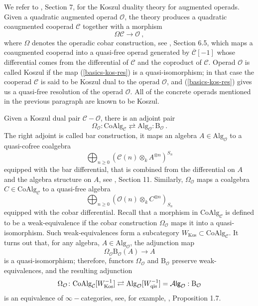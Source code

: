 \documentclass[10pt, oneside]{amsart}
\theoremstyle{plain}
\newcommand{\alg}{\mathrm{Alg}}
\newcommand{\Alg}{\mathcal{A}\text{\sf lg}}
\newcommand{\C}{\mathcal{C}}
\newcommand{\coalg}{\mathrm{CoAlg}}
\renewcommand{\O}{\mathcal{O}}
\begin{document}
We refer to \cite{LV}, Section 7, for the Koszul duality theory for augmented operads. Given a quadratic augmented operad $\O$, the
theory produces a quadratic coaugmented cooperad $\C$ together with a morphism
\begin{equation}\label{basics-kos-res}
\Omega \C \longrightarrow \O \:,
\end{equation}
where $\Omega$ denotes the operadic cobar construction, see \cite{LV}, Section 6.5, which maps a coaugmented cooperad into
a quasi-free operad generated by $\overline{\C}[-1]$ whose differential comes from the differential of $\C$ and the
coproduct of $\C$. Operad $\O$ is called Koszul if the map (\ref{basics-kos-res}) is a quasi-isomorphism; in that case
the cooperad $\C$ is said to be Koszul dual to the operad $\O$, and 
(\ref{basics-kos-res}) gives us a quasi-free resolution of the operad $\O$. All of the concrete operads mentioned in the previous 
paragraph are known to be Koszul.

Given a Koszul dual pair $\C - \O$, there is an adjoint pair
\begin{equation*}
\Omega_{\O} \colon \coalg_\C \rightleftarrows \alg_\O : \text{B}_{\O} \:.
\end{equation*}
The right adjoint is called bar construction, it maps an algebra $A \in \alg_\O$ to a quasi-cofree coalgebra
\begin{equation*}
\bigoplus_{n\ge 0} (\C(n) \otimes_k A^{\otimes n})^{S_n}
\end{equation*}
equipped with the bar differential, that is combined from the differential on $A$ and the algebra structure on $A$, see \cite{LV},
Section 11. Similarly, $\Omega_\O$ maps a coalgebra $C \in \coalg_\C$ to a quasi-free algebra
\begin{equation*}
\bigoplus_{n\ge 0} (\O(n) \otimes_k C^{\otimes n})_{S_n}
\end{equation*}
equipped with the cobar differential. Recall that a morphism in $\coalg_\C$ is defined to be a weak-equivalence if the cobar 
construction
$\Omega_\O$ maps it into a quasi-isomorphism. Such weak-equivalences form a subcategory $W_\text{Kos} \subset \coalg_\C$.
It turns out that, for any algebra, $A \in \alg_\O$, the adjunction map
\begin{equation*}
\Omega_\O \text{B}_\O (A) \longrightarrow A
\end{equation*}
is a quasi-isomorphism; therefore, functors $\Omega_\O$ and $\text{B}_\O$ preserve weak-equivalences, and the resulting
adjunction
\begin{equation*}
\Omega_{\O} \colon \coalg_\C[W^{-1}_\text{Kos}] \rightleftarrows \alg_\O[W^{-1}_\text{qis}] = \Alg_\O : \text{B}_{\O}
\end{equation*}
is an equivalence of $\infty-$categories, see, for example, \cite{Safronov_2018}, Proposition 1.7.
\end{document}
